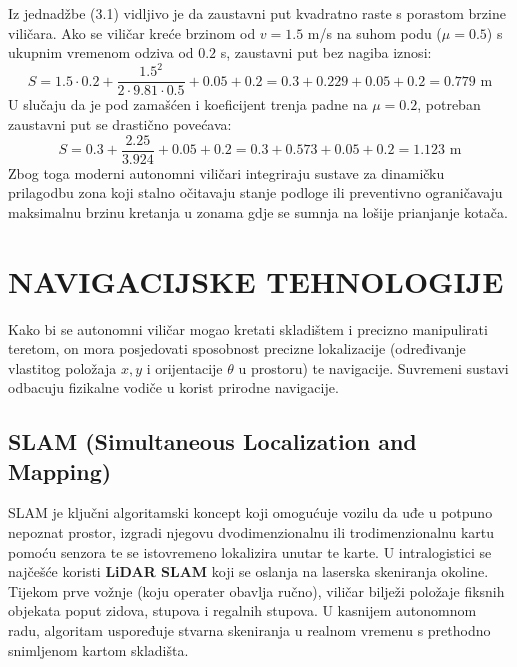 \documentclass[12pt,a4paper]{article}
\begin{document}
Iz jednadžbe (3.1) vidljivo je da zaustavni put kvadratno raste s porastom brzine viličara. Ako se viličar kreće brzinom od $v = 1.5$ m/s na suhom podu ($\mu = 0.5$) s ukupnim vremenom odziva od $0.2$ s, zaustavni put bez nagiba iznosi:
\begin{equation*}
    S = 1.5 \cdot 0.2 + \frac{1.5^2}{2 \cdot 9.81 \cdot 0.5} + 0.05 + 0.2 = 0.3 + 0.229 + 0.05 + 0.2 = 0.779\text{ m}
\end{equation*}
U slučaju da je pod zamašćen i koeficijent trenja padne na $\mu = 0.2$, potreban zaustavni put se drastično povećava:
\begin{equation*}
    S = 0.3 + \frac{2.25}{3.924} + 0.05 + 0.2 = 0.3 + 0.573 + 0.05 + 0.2 = 1.123\text{ m}
\end{equation*}
Zbog toga moderni autonomni viličari integriraju sustave za dinamičku prilagodbu zona koji stalno očitavaju stanje podloge ili preventivno ograničavaju maksimalnu brzinu kretanja u zonama gdje se sumnja na lošije prianjanje kotača.

\section{NAVIGACIJSKE TEHNOLOGIJE}
Kako bi se autonomni viličar mogao kretati skladištem i precizno manipulirati teretom, on mora posjedovati sposobnost precizne lokalizacije (određivanje vlastitog položaja $x, y$ i orijentacije $\theta$ u prostoru) te navigacije. Suvremeni sustavi odbacuju fizikalne vodiče u korist prirodne navigacije.

\subsection{SLAM (Simultaneous Localization and Mapping)}
SLAM je ključni algoritamski koncept koji omogućuje vozilu da uđe u potpuno nepoznat prostor, izgradi njegovu dvodimenzionalnu ili trodimenzionalnu kartu pomoću senzora te se istovremeno lokalizira unutar te karte. U intralogistici se najčešće koristi \textbf{LiDAR SLAM} koji se oslanja na laserska skeniranja okoline. Tijekom prve vožnje (koju operater obavlja ručno), viličar bilježi položaje fiksnih objekata poput zidova, stupova i regalnih stupova. U kasnijem autonomnom radu, algoritam uspoređuje stvarna skeniranja u realnom vremenu s prethodno snimljenom kartom skladišta.
\end{document}

